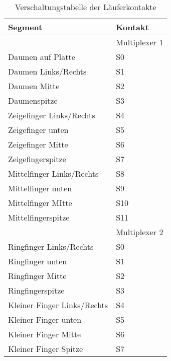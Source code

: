 \begin{table}[H]
    \centering
    \begin{tabular}{|l|l|}
        \hline
        Segment&Kontakt\\
        \hline
        \hline
        &Multiplexer 1\\
        \hline
        Daumen auf Platte&S0\\
        \hline
        Daumen Links/Rechts&S1\\
        \hline
        Daumen Mitte&S2\\
        \hline
        Daumenspitze&S3\\
        \hline
        Zeigefinger Links/Rechts&S4\\
        \hline
        Zeigefinger unten&S5\\
        \hline
        Zeigefinger Mitte&S6\\
        \hline
        Zeigefingerspitze&S7\\
        \hline
        Mittelfinger Links/Rechts&S8\\
        \hline
        Mittelfinger unten&S9\\
        \hline
        Mittelfinger MItte&S10\\
        \hline
        Mittelfingerspitze&S11\\
        \hline
        \hline
        &Multiplexer 2\\
        \hline
        Ringfinger Links/Rechts&S0\\
        \hline
        Ringfinger unten&S1\\
        \hline
        Ringfinger Mitte&S2\\
        \hline
        Ringfingerspitze&S3\\
        \hline
        Kleiner Finger Links/Rechts&S4\\
        \hline
        Kleiner Finger unten&S5\\
        \hline
        Kleiner Finger Mitte&S6\\
        \hline
        Kleiner Finger Spitze&S7\\
        \hline
    \end{tabular}
    \caption{Verschaltungstabelle der Läuferkontakte}
    \label{tab:circuit}
\end{table}

